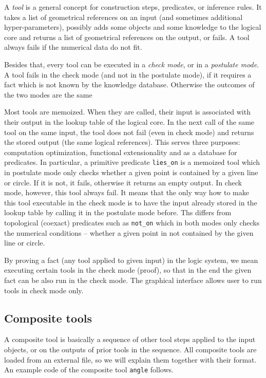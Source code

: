 \documentclass[runningheads]{llncs}
\begin{document}
A \emph{tool} is a general concept for construction steps, predicates,
or inference rules. It takes a list of geometrical references on an
input (and sometimes additional hyper-parameters), possibly adds some
objects and some knowledge to the logical core and returns a list of
geometrical references on the output, or fails. A tool always fails
if the numerical data do not fit.

Besides that, every tool can be executed in a \emph{check mode}, or in
a \emph{postulate mode}. A tool fails in the check mode (and not in
the postulate mode), if it requires a fact which is not known by the
knowledge database. Otherwise the outcomes of the two modes are the
same

Most tools are memoized. When they are called, their input is
associated with their output in the lookup table of the logical
core. In the next call of the same tool on the same input, the tool
does not fail (even in check mode) and returns the stored output (the
same logical references). This serves three purposes: computation
optimization, functional extensionality and as a database for
predicates.
In particular, a primitive predicate \texttt{lies\_on} is a memoized
tool which in postulate mode only checks whether a given point is
contained by a given line or circle. If it is not, it fails, otherwise
it returns an empty output. In check mode, however, this tool always
fail. It means that the only way how to make this tool executable in
the check mode is to have the input already stored in the lookup
table by calling it in the postulate mode before. Ths differs from
topological (coexact) predicates such as \texttt{not\_on} which in
both modes only checks the numerical conditions -- whether a given
point in not contained by the given line or circle.

By proving a fact (any tool applied to given input) in the logic
system, we mean executing certain tools in the check mode (proof), so
that in the end the given fact can be also run in the check mode.
The graphical interface allows user to run tools in check mode only.

\subsection{Composite tools}
\label{composite-tools}

A composite tool is basically a sequence of other tool steps applied
to the input objects, or on the outputs of prior tools in the
sequence. All composite tools are loaded from an external file, so we
will explain them together with their format. An example code
of the composite tool \texttt{angle} follows.
\end{document}
